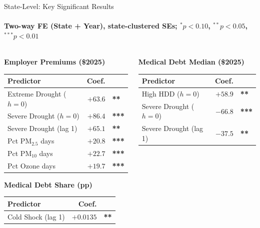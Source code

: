 \documentclass[aspectratio=169,11pt]{beamer}
\newcommand{\emphcolor}[1]{{\color{WarmOrange}\textbf{#1}}}
\newcommand{\tealtext}[1]{{\color{Teal}#1}}
\begin{document}
\begin{frame}{State-Level: Key Significant Results}
  \framesubtitle{Two-way FE (State + Year), state-clustered SEs; $^{*}p{<}0.10$, $^{**}p{<}0.05$, $^{***}p{<}0.01$}
  \small
  \begin{columns}[T]
    \begin{column}{0.50\textwidth}
      \textbf{\tealtext{Employer Premiums} (\$2025)}\\[0.3em]
      \begin{tabular}{lrl}
        \toprule
        Predictor & Coef. & \\
        \midrule
        Extreme Drought ($h{=}0$) & $+63.6$ & \emphcolor{**} \\
        Severe Drought ($h{=}0$) & $+86.4$ & \emphcolor{***} \\
        Severe Drought (lag 1) & $+65.1$ & \emphcolor{**} \\
        Pct PM$_{2.5}$ days & $+20.8$ & \emphcolor{***} \\
        Pct PM$_{10}$ days & $+22.7$ & \emphcolor{***} \\
        Pct Ozone days & $+19.7$ & \emphcolor{***} \\
        \bottomrule
      \end{tabular}
      \vspace{0.5em}

      \textbf{\tealtext{Medical Debt Share (pp)}}\\[0.3em]
      \begin{tabular}{lrl}
        \toprule
        Predictor & Coef. & \\
        \midrule
        Cold Shock (lag 1) & $+0.0135$ & \emphcolor{**} \\
        \bottomrule
      \end{tabular}
    \end{column}
    \begin{column}{0.46\textwidth}
      \textbf{\tealtext{Medical Debt Median (\$2025)}}\\[0.3em]
      \begin{tabular}{lrl}
        \toprule
        Predictor & Coef. & \\
        \midrule
        High HDD ($h{=}0$) & $+58.9$ & \emphcolor{**} \\
        Severe Drought ($h{=}0$) & $-66.8$ & \emphcolor{***} \\
        Severe Drought (lag 1) & $-37.5$ & \emphcolor{**} \\
        \bottomrule
      \end{tabular}
      \vspace{0.5em}


\end{column}
\end{columns}
\end{frame}
\end{document}
